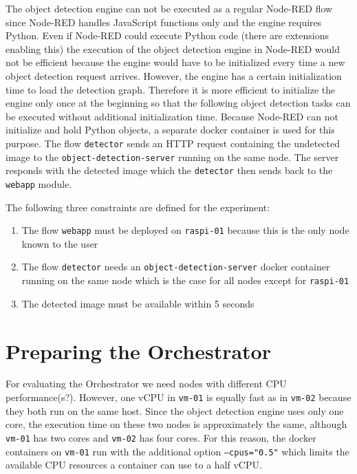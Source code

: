The object detection engine can not be executed as a regular Node-RED flow since Node-RED handles JavaScript functions only and the engine requires Python. Even if Node-RED could execute Python code (there are extensions enabling this) the execution of the object detection engine in Node-RED would not be efficient because the engine would have to be initialized every time a new object detection request arrives. However, the engine has a certain initialization time to load the detection graph. Therefore it is more efficient to initialize the engine only once at the beginning so that the following object detection tasks can be executed without additional initialization time. Because Node-RED can not initialize and hold Python objects, a separate docker container is used for this purpose. The flow \texttt{detector} sends an HTTP request containing the undetected image to the \texttt{object-detection-server} running on the same node. The server responds with the detected image which the \texttt{detector} then sends back to the \texttt{webapp} module.

The following three constraints are defined for the experiment:
\begin{enumerate}
    \item The flow \texttt{webapp} must be deployed on \texttt{raspi-01} because this is the only node known to the user
    \item The flow \texttt{detector} needs an \texttt{object-detection-server} docker container running on the same node which is the case for all nodes except for \texttt{raspi-01}
    \item The detected image must be available within 5 seconds
\end{enumerate}

\section{Preparing the Orchestrator\label{sec:eval-preparing-the-orchestrator}}

For evaluating the Orchestrator we need nodes with different CPU performance(s?).
However, one vCPU in \texttt{vm-01} is equally fast as in \texttt{vm-02} because they both run on the same host.
Since the object detection engine uses only one core, the execution time on these two nodes is approximately the same, although \texttt{vm-01} has two cores and \texttt{vm-02} has four cores. For this reason, the docker containers on \texttt{vm-01} run with the additional option \texttt{---cpus="0.5"} which limits the available CPU resources a container can use to a half vCPU.

